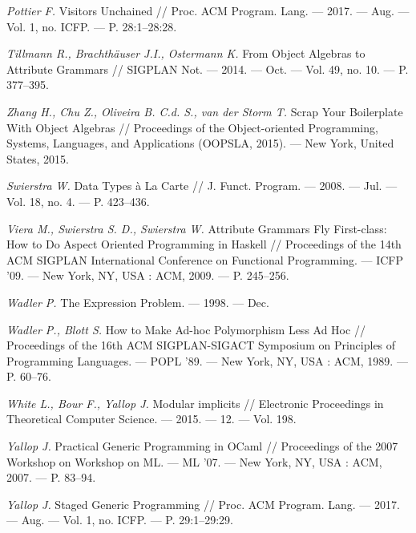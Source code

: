 \begin{thebibliography}{99}
{\em Pottier F.} Visitors Unchained // Proc. ACM Program.
Lang. — 2017. — Aug. — Vol. 1, no. ICFP. — P. 28:1–28:28. 

{\em Tillmann R., Brachth\"auser J.I., Ostermann K. } From Object Algebras to Attribute Grammars //
 SIGPLAN Not. — 2014. — Oct. — Vol. 49, no. 10. — P. 377–395. 

{\em Zhang H., Chu Z.,  Oliveira B. C.d. S., van der Storm T.}
Scrap Your Boilerplate With Object Algebras  // Proceedings of the Object-oriented Programming, Systems, Languages, and
 Applications (OOPSLA, 2015). — New York, United States, 2015. %

{\em Swierstra W.} Data Types \`a La Carte // J. Funct. Program. —
 2008. — Jul. — Vol. 18, no. 4. — P. 423–436.

{\em Viera M., Swierstra S. D., Swierstra W.} Attribute
 Grammars Fly First-class: How to Do Aspect Oriented 
 Program\-ming in Haskell // Proceedings of the 14th ACM SIGPLAN 
 In\-ternational Conference on Functional Programming. — ICFP ’09. —
 New York, NY, USA : ACM, 2009. — P. 245–256. 

{\em Wadler P.} The Expression Problem. — 1998. — Dec.
 
{\em Wadler P., Blott S.} How to Make Ad-hoc Polymorphism Less Ad
 Hoc // Proceedings of the 16th ACM SIGPLAN-SIGACT Symposium on Principles of Programming Languages. — POPL ’89. — New
 York, NY, USA : ACM, 1989. — P. 60–76. 

{\em White L., Bour F., Yallop J.} Modular implicits // Electronic Proceedings in Theoretical Computer Science. — 2015. — 12. —
 Vol. 198.
 
{\em Yallop J.} Practical Generic Programming in OCaml // Proceedings of the 2007 Workshop on Workshop on ML. — ML ’07. —
 New York, NY, USA : ACM, 2007. — P. 83–94. 

{\em  Yallop J.} Staged Generic Programming // Proc. ACM Program. Lang. — 2017. — Aug. — Vol. 1, no. ICFP. — P. 29:1–29:29. 


\end{thebibliography}
